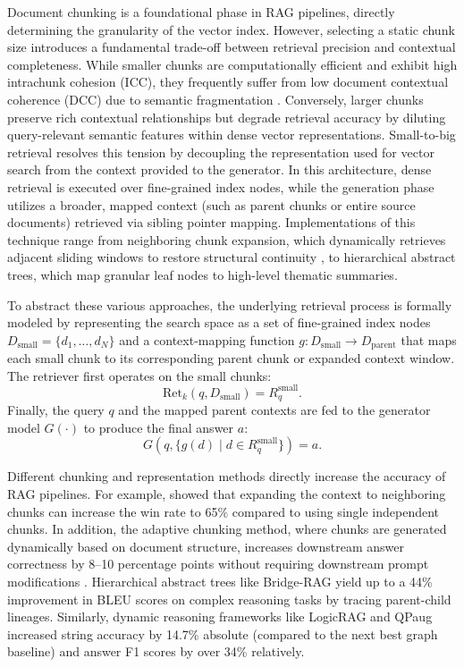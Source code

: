 Document chunking is a foundational phase in RAG pipelines, directly determining the granularity of the vector index. However, selecting a static chunk size introduces a fundamental trade-off between retrieval precision and contextual completeness. While smaller chunks are computationally efficient and exhibit high intrachunk cohesion (ICC), they frequently suffer from low document contextual coherence (DCC) due to semantic fragmentation \cite{demourajunior2026adaptive}. Conversely, larger chunks preserve rich contextual relationships but degrade retrieval accuracy by diluting query-relevant semantic features within dense vector representations. Small-to-big retrieval resolves this tension by decoupling the representation used for vector search from the context provided to the generator. In this architecture, dense retrieval is executed over fine-grained index nodes, while the generation phase utilizes a broader, mapped context (such as parent chunks or entire source documents) retrieved via sibling pointer mapping. Implementations of this technique range from neighboring chunk expansion, which dynamically retrieves adjacent sliding windows to restore structural continuity \cite{lumer2025rethinking}, to hierarchical abstract trees, which map granular leaf nodes to high-level thematic summaries\cite{li2026bridgerag}.

To abstract these various approaches, the underlying retrieval process is formally modeled by representing the search space as a set of fine-grained index nodes $D_{\text{small}} = \{d_1, \ldots, d_N\}$ and a context-mapping function $g: D_{\text{small}} \to D_{\text{parent}}$ that maps each small chunk to its corresponding parent chunk or expanded context window. The retriever first operates on the small chunks:
\begin{equation}
\text{Ret}_k(q, D_{\text{small}}) = R_q^{\text{small}}.
\end{equation}
Finally, the query $q$ and the mapped parent contexts are fed to the generator model $G(\cdot)$ to produce the final answer $a$:
\begin{equation}
G\left(q, \{ g(d) \mid d \in R_q^{\text{small}} \}\right) = a.
\end{equation}

Different chunking and representation methods directly increase the accuracy of RAG pipelines. For example, \citet{lumer2025rethinking} showed that expanding the context to neighboring chunks can increase the win rate to 65\% compared to using single independent chunks. In addition, the adaptive chunking method, where chunks are generated dynamically based on document structure, increases downstream answer correctness by 8--10 percentage points without requiring downstream prompt modifications \cite{demourajunior2026adaptive}. Hierarchical abstract trees like Bridge-RAG \cite{li2026bridgerag} yield up to a 44\% improvement in BLEU scores on complex reasoning tasks by tracing parent-child lineages. Similarly, dynamic reasoning frameworks like LogicRAG \cite{chen2026logicrag} and QPaug \cite{kim2024qpaug} increased string accuracy by 14.7\% absolute (compared to the next best graph baseline) and answer F1 scores by over 34\% relatively.

